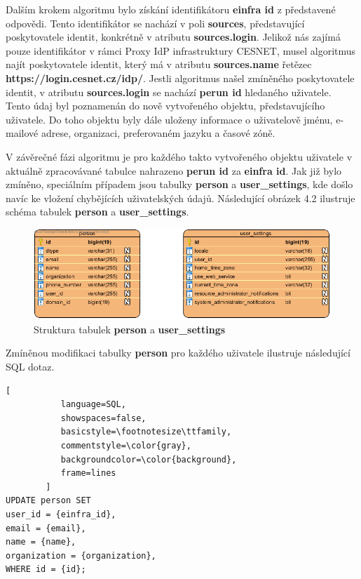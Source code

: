 \documentclass[
  printed, %
  twoside, %
  table,   %
  nolof,     %
  nolot,     %
]{fithesis3}
\begin{document}
Dalším krokem algoritmu bylo získání identifikátoru \textbf{einfra id} z představené odpovědi. Tento identifikátor se nachází v poli \textbf{sources}, představující poskytovatele identit, konkrétně v atributu \textbf{sources.login}. Jelikož nás zajímá pouze identifikátor v rámci Proxy IdP infrastruktury CESNET, musel algoritmus najít poskytovatele identit, který má v atributu \textbf{sources.name} řetězec \textbf{https://login.cesnet.cz/idp/}. Jestli algoritmus našel zmíněného poskytovatele identit, v atributu \textbf{sources.login} se nachází \textbf{perun id} hledaného uživatele. Tento údaj byl poznamenán do nově vytvořeného objektu, představujícího uživatele. Do toho objektu byly dále uloženy informace o uživatelově jménu, e-mailové adrese, organizaci, preferovaném jazyku a časové zóně. 

\par

V závěrečné fázi algoritmu je pro každého takto vytvořeného objektu uživatele v aktuálně zpracovávané tabulce nahrazeno \textbf{perun id} za \textbf{einfra id}. Jak již bylo zmíněno, speciálním případem jsou tabulky \textbf{person} a \textbf{user\_settings}, kde došlo navíc ke vložení chybějících uživatelských údajů. Následující obrázek 4.2 ilustruje schéma tabulek \textbf{person} a \textbf{user\_settings}. 

\begin{figure}[H]
\label{fig:erd-person-user-settings}
\caption{Struktura tabulek \textbf{person} a \textbf{user\_settings}}
\centering
\includegraphics[width=12.8cm]{pics/erd-person-user_settings} 
\end{figure}
\par 

Zmíněnou modifikaci tabulky \textbf{person} pro každého uživatele ilustruje následující SQL dotaz.

\begin{lstlisting}[
           language=SQL,
           showspaces=false,
           basicstyle=\footnotesize\ttfamily,
           commentstyle=\color{gray},
           backgroundcolor=\color{background},
           frame=lines
        ]
UPDATE person SET 
user_id = {einfra_id},
email = {email},
name = {name},
organization = {organization},
WHERE id = {id};
\end{lstlisting}
\end{document}
